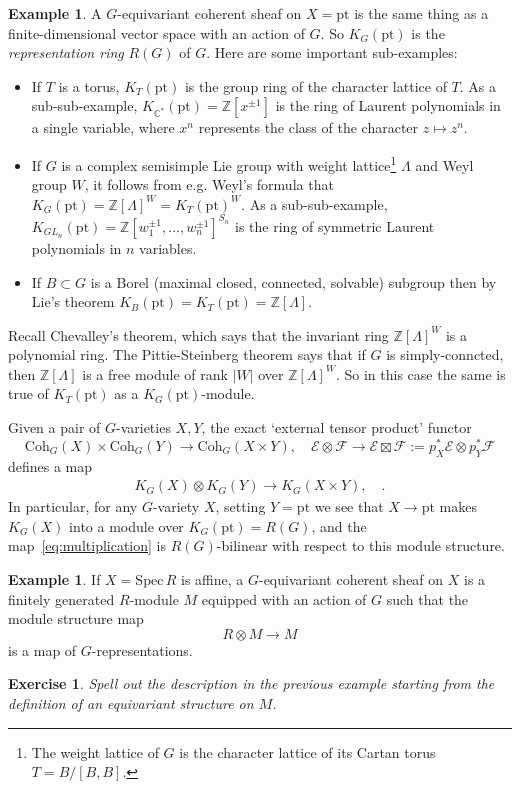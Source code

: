 \documentclass[11pt]{amsart}
\newtheorem{exercise}[dummy]{Exercise}
\theoremstyle{definition}
\newtheorem{example}[dummy]{Example}
\newcommand{\bZ}{\mathbb{Z}}
\newcommand{\Ec}{\mathcal{E}}
\newcommand{\Fc}{\mathcal{F}}
\newcommand{\Spec}{\mathrm{Spec}\,}
\newcommand{\Coh}{\mathrm{Coh}}
\numberwithin{equation}{subsection}
\numberwithin{figure}{subsection}
\newcommand{\pt}{\mathrm{pt}}
\begin{document}
\begin{example}
\label{eg:kpoint}
A $G$-equivariant coherent sheaf on $X=\pt$ is the same thing as a finite-dimensional vector space with an action of $G$. So $K_G(\pt)$ is the \emph{representation ring} $R(G)$ of $G$. Here are some important sub-examples: 
\begin{itemize}
\item If $T$ is a torus, $K_T(\pt)$ is the group ring of the character lattice of $T$. As a sub-sub-example, $K_{\mathbb{C}^*}(\pt)=\mathbb{Z}[x^{\pm1}]$ is the ring of Laurent polynomials in a single variable, where $x^n$ represents the class of the character $z\mapsto z^n$.

\item If $G$ is a complex semisimple Lie group with weight lattice\footnote{The weight lattice of $G$ is the character lattice of its Cartan torus $T=B/[B,B]$.} $\Lambda$  and Weyl group $W$, it follows from e.g. Weyl's formula that $K_G(\pt)=\mathbb{Z}[\Lambda]^W=K_T(\pt)^W$. As a sub-sub-example, $K_{GL_n}(\pt)=\bZ[w_1^{\pm1},\ldots,w_n^{\pm1}]^{S_n}$ is the ring of symmetric Laurent polynomials in $n$ variables.
\item If $B\subset G$ is a Borel (maximal closed, connected, solvable) subgroup then by Lie's theorem $K_B(\pt)=K_T(\pt)=\bZ[\Lambda]$.
\end{itemize}
Recall Chevalley's theorem, which says that the invariant ring $\bZ[\Lambda]^W$ is a polynomial ring. The Pittie-Steinberg theorem says that if $G$ is simply-conncted, then  $\bZ[\Lambda]$ is a free module of rank $|W|$ over $\bZ[\Lambda]^W$. So in this case the same is true of $K_T(\pt)$ as a $K_G(\pt)$-module.
\end{example}

Given a pair of $G$-varieties $X,Y$, the exact `external tensor product' functor 
$$
\Coh_G(X)\times \Coh_G(Y)\rightarrow \Coh_G(X\times Y),\quad \Ec\otimes\Fc \rightarrow \Ec\boxtimes\Fc:=p_X^*\Ec\otimes p_Y^*\Fc
$$ defines a map
\begin{align}
\label{eq:multiplication}
K_G(X)\otimes K_G(Y)\rightarrow K_G(X\times Y),\quad .
\end{align}
In particular, for any $G$-variety $X$, setting $Y=\pt$ we see that $X\rightarrow \pt$ makes $K_G(X)$ into a module over $K_G(\pt)= R(G)$,  and the map~\eqref{eq:multiplication} is $R(G)$-bilinear with respect to this module structure.

\begin{example}
If $X=\Spec R$ is affine, a $G$-equivariant coherent sheaf on $X$ is a finitely generated $R$-module $M$ equipped with an action of $G$ such that the module structure map
$$
R\otimes M \rightarrow M
$$
is a map of $G$-representations.
\end{example}
\begin{exercise}
Spell out the description in the previous example starting from the definition of an equivariant structure on $M$.
\end{exercise}
\end{document}
